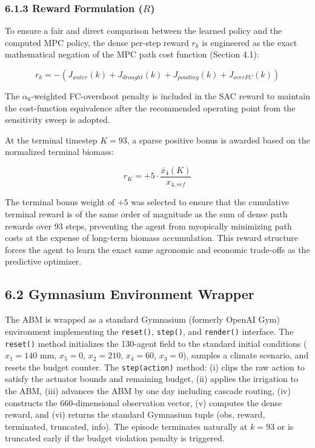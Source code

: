 \subsubsection{\texorpdfstring{6.1.3 Reward Formulation
(\(R\))}{6.1.3 Reward Formulation (R)}}\label{reward-formulation-r}

To ensure a fair and direct comparison between the learned policy and
the computed MPC policy, the dense per-step reward \(r_k\) is engineered
as the exact mathematical negation of the MPC path cost function
(Section 4.1):

\[r_k = -(J_{water}(k) + J_{drought}(k) + J_{ponding}(k) + J_{overFC}(k)) \tag{23}\]

The \(\alpha_6\)-weighted FC-overshoot penalty is included in the SAC
reward to maintain the cost-function equivalence after the recommended
operating point from the sensitivity sweep is adopted.

At the terminal timestep \(K = 93\), a sparse positive bonus is awarded
based on the normalized terminal biomass:

\[r_K = +5 \cdot \frac{\bar{x}_4(K)}{x_{4,ref}} \tag{24}\]

The terminal bonus weight of \(+5\) was selected to ensure that the
cumulative terminal reward is of the same order of magnitude as the sum
of dense path rewards over 93 steps, preventing the agent from
myopically minimizing path costs at the expense of long-term biomass
accumulation. This reward structure forces the agent to learn the exact
same agronomic and economic trade-offs as the predictive optimizer.

\subsection{6.2 Gymnasium Environment
Wrapper}\label{gymnasium-environment-wrapper}

The ABM is wrapped as a standard Gymnasium (formerly OpenAI Gym)
environment implementing the \texttt{reset()}, \texttt{step()}, and
\texttt{render()} interface. The \texttt{reset()} method initializes the
130-agent field to the standard initial conditions (\(x_1 = 140\) mm,
\(x_5 = 0\), \(x_2 = 210\), \(x_4 = 60\), \(x_3 = 0\)), samples a
climate scenario, and resets the budget counter. The
\texttt{step(action)} method: (i) clips the raw action to satisfy the
actuator bounds and remaining budget, (ii) applies the irrigation to the
ABM, (iii) advances the ABM by one day including cascade routing, (iv)
constructs the 660-dimensional observation vector, (v) computes the
dense reward, and (vi) returns the standard Gymnasium tuple (obs,
reward, terminated, truncated, info). The episode terminates naturally
at \(k = 93\) or is truncated early if the budget violation penalty is
triggered.

